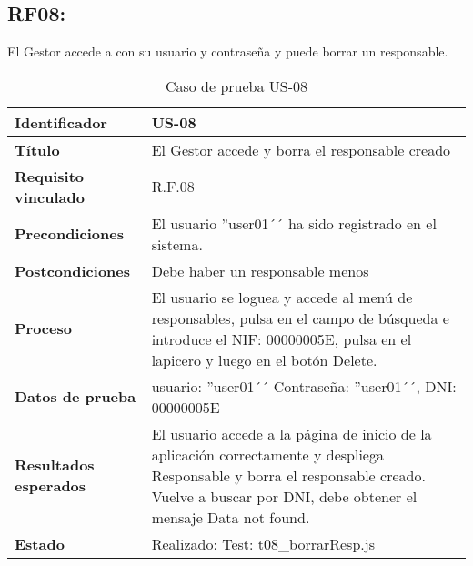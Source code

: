 \subsection{RF08:} El Gestor accede a con su usuario y contraseña y puede borrar un responsable.
\begin{table}[H]
	\centering
	\renewcommand{\arraystretch}{1.3} 
	\begin{tabularx}{\textwidth}{|l|X|}
		\hline
		\textbf{Identificador} & US-08 \\
		\hline
		\textbf{Título} & El Gestor accede y borra el responsable creado \\
		\hline
		\textbf{Requisito vinculado} & R.F.08 \\
		\hline
		\textbf{Precondiciones} & El usuario ''user01´´ ha sido registrado en el sistema.\\
		\hline
		\textbf{Postcondiciones} & Debe haber un responsable menos \\
		\hline
		\textbf{Proceso} & El usuario se loguea y accede al menú de responsables, pulsa en el campo de búsqueda e introduce el NIF: 00000005E, pulsa en el lapicero y luego en el botón Delete.\\
		\hline
		\textbf{Datos de prueba} & usuario: ''user01´´ Contraseña: ''user01´´, DNI: 00000005E \\
		\hline
		\textbf{Resultados esperados} & El usuario accede a la página de inicio de la aplicación correctamente y despliega Responsable y borra el responsable creado. Vuelve a buscar por DNI, debe obtener el mensaje Data not found. \\
		\hline
		\textbf{Estado} & Realizado: Test: t08\_borrarResp.js\\
		\hline
	\end{tabularx}
	\caption{Caso de prueba US-08}
	\label{tab:caso_us08}
\end{table}
